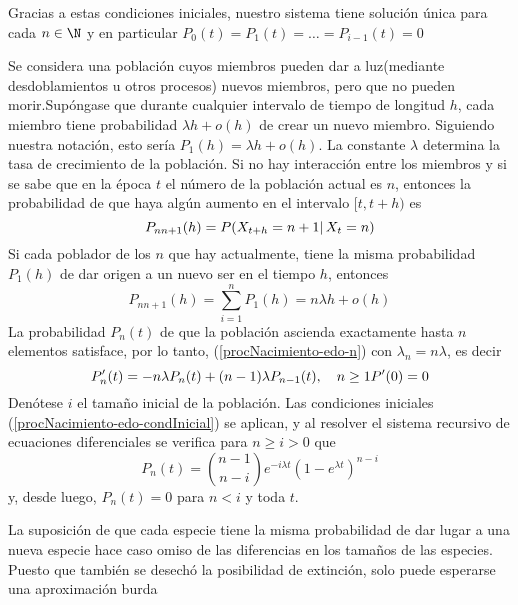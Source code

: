 Gracias a estas condiciones iniciales, nuestro sistema tiene solución única para cada $n\in\N$ y en particular $P_0(t)=P_1(t)=\ldots=P_{i-1}(t)=0$
\begin{Ejm}
    Se considera una población cuyos miembros pueden dar a luz(mediante desdoblamientos u otros procesos) nuevos miembros, pero que no pueden morir.Supóngase que durante cualquier intervalo de tiempo de longitud $h$, cada miembro tiene probabilidad $\lambda h + o(h)$ de crear un nuevo miembro. Siguiendo nuestra notación, esto sería $P_1(h)=\lambda h + o(h)$. La constante $\lambda$ determina la tasa de crecimiento de la población. Si no hay interacción entre los miembros y si se sabe que en la época $t$ el número de la población actual es $n$, entonces la probabilidad de que haya algún aumento en el intervalo $[t,t+h)$  es $$P_{n n+1}(h)=P(X_{t+h}=n+1|\thinspace X_t=n)$$
    Si cada poblador de los $n$ que hay actualmente, tiene la misma probabilidad $P_1(h)$ de dar origen a un nuevo ser en el tiempo $h$, entonces
    $$P_{n n+1}(h)=\sum_{i=1}^n P_1(h)= n\lambda h + o(h)$$
    La probabilidad $P_n(t)$ de que la población ascienda exactamente hasta $n$ elementos satisface, por lo tanto, (\ref{procNacimiento-edo-n}) con $\lambda_n= n\lambda$, es decir $$ P'_n(t)=-n\lambda P_n(t)+(n-1)\lambda P_{n-1}(t),\quad n\geq 1\\P'(0)=0$$
    Denótese $i$ el tamaño inicial de la población.
    Las condiciones iniciales (\ref{procNacimiento-edo-condInicial}) se aplican, y al resolver el sistema recursivo de ecuaciones diferenciales se verifica para $n\geq i>0$ que 
    $$P_n(t)={ n-1 \choose n-i}e^{-i\lambda t}(1-e^{\lambda t})^{n-i}$$
    y, desde luego, $P_n(t)=0$ para $n<i$ y toda $t$.
\end{Ejm}
La suposición de que cada especie tiene la misma probabilidad de dar lugar a una nueva especie hace caso omiso de las diferencias en los tamaños de las especies. Puesto que también se desechó la posibilidad de extinción, solo puede esperarse una aproximación burda